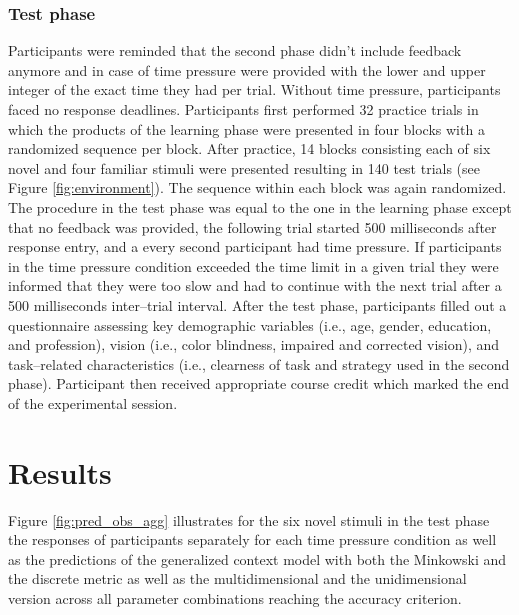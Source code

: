 \documentclass[a4paper,man,natbib]{apa6}
\begin{document}
\subsubsection{Test phase}
Participants were reminded that the second phase didn't include feedback anymore and in case of time pressure were provided with the lower and upper integer of the exact time they had per trial. Without time pressure, participants faced no response deadlines. Participants first performed 32 practice trials in which the products of the learning phase were presented in four blocks with a randomized sequence per block. After practice, 14 blocks consisting each of six novel and four familiar stimuli were presented resulting in 140 test trials (see Figure \ref{fig:environment}). The sequence within each block was again randomized. The procedure in the test phase was equal to the one in the learning phase except that no feedback was provided, the following trial started 500 milliseconds after response entry, and a every second participant had time pressure. If participants in the time pressure condition exceeded the time limit in a given trial they were informed that they were too slow and had to continue with the next trial after a 500 milliseconds inter--trial interval. After the test phase, participants filled out a questionnaire assessing key demographic variables (i.e., age, gender, education, and profession), vision (i.e., color blindness, impaired and corrected vision), and task--related characteristics (i.e., clearness of task and strategy used in the second phase). Participant then received appropriate course credit which marked the end of the experimental session.

\section{Results}
Figure \ref{fig:pred_obs_agg} illustrates for the six novel stimuli in the test phase the responses of participants separately for each time pressure condition as well as the predictions of the generalized context model with both the Minkowski and the discrete metric as well as the multidimensional and the unidimensional version across all parameter combinations reaching the accuracy criterion.
\end{document}
